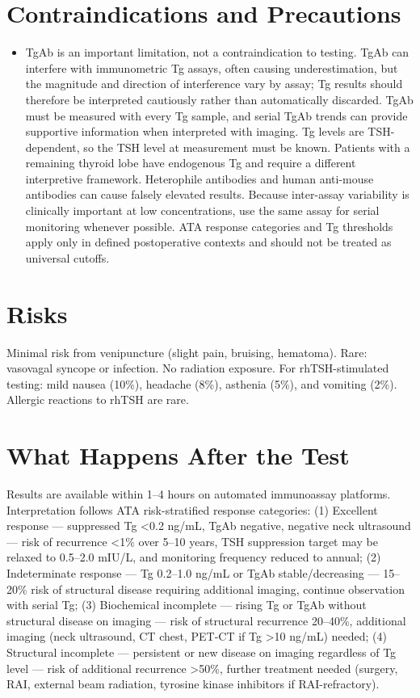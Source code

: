 \section*{Contraindications and Precautions}
\begin{itemize}
  \item TgAb is an important limitation, not a contraindication to testing. TgAb can interfere with immunometric Tg assays, often causing underestimation, but the magnitude and direction of interference vary by assay; Tg results should therefore be interpreted cautiously rather than automatically discarded. TgAb must be measured with every Tg sample, and serial TgAb trends can provide supportive information when interpreted with imaging. Tg levels are TSH-dependent, so the TSH level at measurement must be known. Patients with a remaining thyroid lobe have endogenous Tg and require a different interpretive framework. Heterophile antibodies and human anti-mouse antibodies can cause falsely elevated results. Because inter-assay variability is clinically important at low concentrations, use the same assay for serial monitoring whenever possible. ATA response categories and Tg thresholds apply only in defined postoperative contexts and should not be treated as universal cutoffs.
\end{itemize}
\section*{Risks}
Minimal risk from venipuncture (slight pain, bruising, hematoma). Rare: vasovagal syncope or infection. No radiation exposure. For rhTSH-stimulated testing: mild nausea (10\%), headache (8\%), asthenia (5\%), and vomiting (2\%). Allergic reactions to rhTSH are rare.

\section*{What Happens After the Test}
Results are available within 1--4 hours on automated immunoassay platforms. Interpretation follows ATA risk-stratified response categories: (1) Excellent response --- suppressed Tg <0.2 ng/mL, TgAb negative, negative neck ultrasound --- risk of recurrence <1\% over 5--10 years, TSH suppression target may be relaxed to 0.5--2.0 mIU/L, and monitoring frequency reduced to annual; (2) Indeterminate response --- Tg 0.2--1.0 ng/mL or TgAb stable/decreasing --- 15--20\% risk of structural disease requiring additional imaging, continue observation with serial Tg; (3) Biochemical incomplete --- rising Tg or TgAb without structural disease on imaging --- risk of structural recurrence 20--40\%, additional imaging (neck ultrasound, CT chest, PET-CT if Tg >10 ng/mL) needed; (4) Structural incomplete --- persistent or new disease on imaging regardless of Tg level --- risk of additional recurrence >50\%, further treatment needed (surgery, RAI, external beam radiation, tyrosine kinase inhibitors if RAI-refractory).

